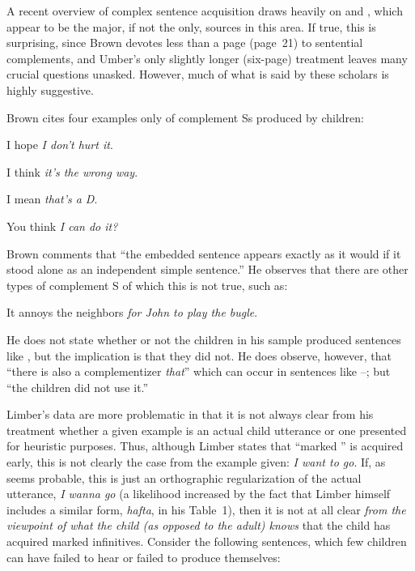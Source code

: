 A recent overview of complex sentence acquisition \citep{Bowerman1979} draws heavily on \citet{Brown1973} and \citet{Limber1973}, which appear to be the major, if not the only, sources in this area. If true, this is surprising, since Brown devotes less than a page (page~21) to sentential complements, and Umber's only slightly longer (six-page) treatment leaves many crucial questions unasked. However, much of what is said by these scholars is highly suggestive.

Brown cites four examples only of complement Ss produced by children:

\ea\label{ex:3:24}
 I hope \textit{I don't hurt it}.
\z

\ea\label{ex:3:25}
 I think \textit{it's the wrong way}.
\z

\ea\label{ex:3:26}
 I mean \textit{that's a D}.
\z

\ea\label{ex:3:27}
 You think \textit{I can do it?}
\z

\noindent Brown comments that ``the embedded sentence appears exactly as it would if it stood alone as an independent simple sentence.'' He observes that there are other types of complement S of which this is not true, such as:

\ea\label{ex:3:28}
 It annoys the neighbors \textit{for John to play the bugle}.
\z

\noindent He does not state whether or not the children in his sample produced sentences like , but the implication is that they did not. He does observe, however, that ``there is also a complementizer \textit{that}'' which can occur in sentences like --; but ``the children did not use it.''

Limber's data are more problematic in that it is not always clear from his treatment whether a given example is an actual child utterance or one presented for heuristic purposes. Thus, although Limber states that ``marked '' is acquired early, this is not clearly the case from the example given: \textit{I want to go}. If, as seems probable, this is just an orthographic regularization of the actual utterance, \textit{I wanna go} (a likelihood increased by the fact that Limber himself includes a similar form, \textit{hafta}, in his Table~1), then it is not at all clear \textit{from the viewpoint of what the child (as opposed to the adult) knows} that the child has acquired marked infinitives. Consider the following sentences, which few children can have failed to hear or failed to produce themselves:


